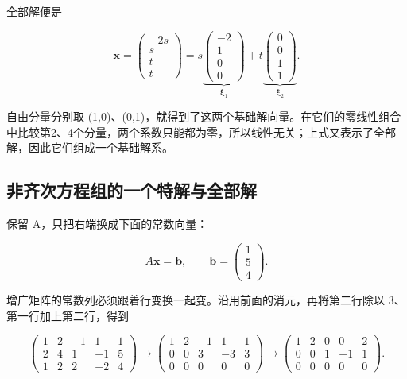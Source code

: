\documentclass[
  11pt,
  a4paper,
  fontset=fandol]{ctexart}
\begin{document}
全部解便是

\[\boldsymbol x=
\begin{pmatrix}-2s\\s\\t\\t\end{pmatrix}
=s\underbrace{\begin{pmatrix}-2\\1\\0\\0\end{pmatrix}}_{\boldsymbol\xi_1}
+t\underbrace{\begin{pmatrix}0\\0\\1\\1\end{pmatrix}}_{\boldsymbol\xi_2}.\]

自由分量分别取
(1,0)、(0,1)，就得到了这两个基础解向量。在它们的零线性组合中比较第2、4个分量，两个系数只能都为零，所以线性无关；上式又表示了全部解，因此它们组成一个基础解系。


\subsection{非齐次方程组的一个特解与全部解}\label{ux975eux9f50ux6b21ux65b9ux7a0bux7ec4ux7684ux4e00ux4e2aux7279ux89e3ux4e0eux5168ux90e8ux89e3}

保留 A，只把右端换成下面的常数向量：

\[A\boldsymbol x=\boldsymbol b,
\qquad\boldsymbol b=\begin{pmatrix}1\\5\\4\end{pmatrix}.\]

增广矩阵的常数列必须跟着行变换一起变。沿用前面的消元，再将第二行除以
3、第一行加上第二行，得到

\[\left(\begin{array}{rrrr|r}
1&2&-1&1&1\\2&4&1&-1&5\\1&2&2&-2&4
\end{array}\right)
\longrightarrow
\left(\begin{array}{rrrr|r}
1&2&-1&1&1\\0&0&3&-3&3\\0&0&0&0&0
\end{array}\right)
\longrightarrow
\left(\begin{array}{rrrr|r}
1&2&0&0&2\\0&0&1&-1&1\\0&0&0&0&0
\end{array}\right).\]
\end{document}
